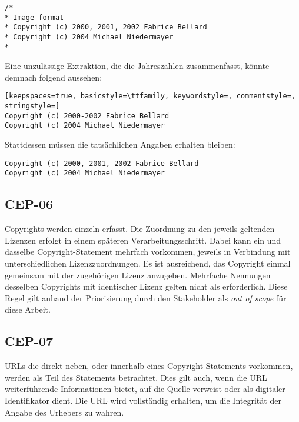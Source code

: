 \begin{lstlisting}[keepspaces=true]
/*
* Image format
* Copyright (c) 2000, 2001, 2002 Fabrice Bellard
* Copyright (c) 2004 Michael Niedermayer
*
\end{lstlisting}

Eine unzulässige Extraktion, die die Jahreszahlen zusammenfasst, könnte demnach folgend aussehen:

\begin{lstlisting}[keepspaces=true, basicstyle=\ttfamily, keywordstyle=, commentstyle=, stringstyle=]
Copyright (c) 2000-2002 Fabrice Bellard
Copyright (c) 2004 Michael Niedermayer
\end{lstlisting}

Stattdessen müssen die tatsächlichen Angaben erhalten bleiben:

\begin{lstlisting}[keepspaces=true, keepspaces=true]
Copyright (c) 2000, 2001, 2002 Fabrice Bellard
Copyright (c) 2004 Michael Niedermayer
\end{lstlisting}


\subsection{CEP-06}\label{subsec:cep-06}

Copyrights werden einzeln erfasst.
Die Zuordnung zu den jeweils geltenden Lizenzen erfolgt in einem späteren Verarbeitungsschritt.
Dabei kann ein und dasselbe Copyright-Statement mehrfach vorkommen, jeweils in Verbindung mit unterschiedlichen Lizenzzuordnungen.
Es ist ausreichend, das Copyright einmal gemeinsam mit der zugehörigen Lizenz anzugeben.
Mehrfache Nennungen desselben Copyrights mit identischer Lizenz gelten nicht als erforderlich.
Diese Regel gilt anhand der Priorisierung durch den Stakeholder als \textit{out of scope} für diese Arbeit.



\subsection{CEP-07}\label{subsec:cep-07}

URLs die direkt neben, oder innerhalb eines Copyright-Statements vorkommen, werden als Teil des Statements betrachtet.
Dies gilt auch, wenn die URL weiterführende Informationen bietet, auf die Quelle verweist oder als digitaler Identifikator dient.
Die URL wird vollständig erhalten, um die Integrität der Angabe des Urhebers zu wahren.

